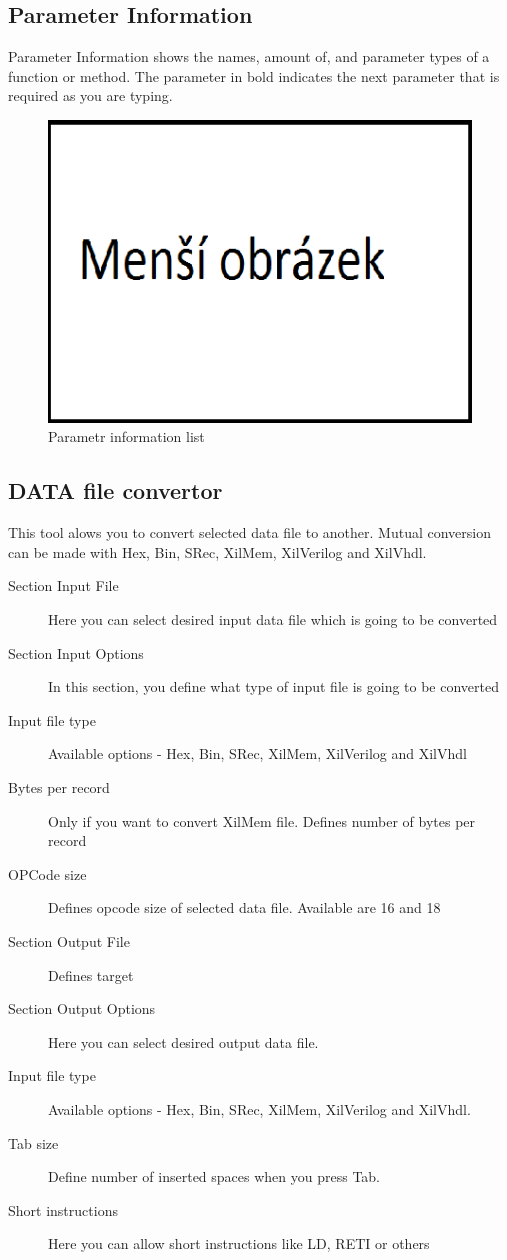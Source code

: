 \clearpage
\subsection{Parameter Information}
    Parameter Information shows the names, amount of, and parameter types of a function or method. The parameter in bold indicates the next parameter that is required as you are typing.
    \begin{figure}[h]
        \centering{}
        \includegraphics[width=.3\textwidth]{img/mensi_obrazek.png}
        \caption{Parametr information list}
    \end{figure}

\subsection{DATA file convertor}
    This tool alows you to convert selected data file to another. Mutual conversion can be made with Hex, Bin, SRec, XilMem, XilVerilog and XilVhdl.
    \begin{description}
        \item[Section Input File] Here you can select desired input data file which is going to be converted
        \item[Section Input Options] In this section, you define what type of input file is going to be converted
        \item[Input file type] Available options - Hex, Bin, SRec, XilMem, XilVerilog and XilVhdl
        \item[Bytes per record] Only if you want to convert XilMem file. Defines number of bytes per record
        \item[OPCode size] Defines opcode size of selected data file. Available are 16 and 18
        \item[Section Output File] Defines target
        \item[Section Output Options] Here you can select desired output data file.
        \item[Input file type] Available options - Hex, Bin, SRec, XilMem, XilVerilog and XilVhdl.
        \item[Tab size]  Define number of inserted spaces when you press Tab.
        \item[Short instructions] Here you can allow short instructions like LD, RETI or others
    \end{description}

